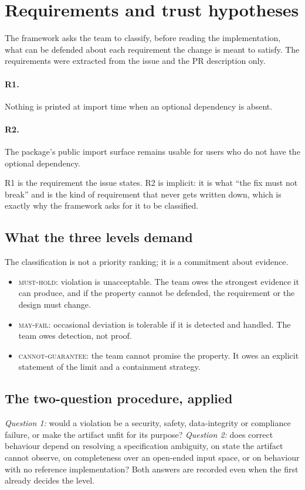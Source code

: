 \documentclass[11pt,a4paper]{article}
\newcommand{\musthold}{\textsc{must-hold}}
\newcommand{\mayfail}{\textsc{may-fail}}
\newcommand{\cannot}{\textsc{cannot-guarantee}}
\begin{document}
\section{Requirements and trust hypotheses}
\label{sec:hyp}

The framework asks the team to classify, before reading the implementation, what can be defended about each requirement the change is meant to satisfy. The requirements were extracted from the issue and the PR description only.

\paragraph{R1.} Nothing is printed at import time when an optional dependency is absent.

\paragraph{R2.} The package's public import surface remains usable for users who do not have the optional dependency.

R1 is the requirement the issue states. R2 is implicit: it is what ``the fix must not break'' and is the kind of requirement that never gets written down, which is exactly why the framework asks for it to be classified.

\subsection{What the three levels demand}
The classification is not a priority ranking; it is a commitment about evidence.
\begin{itemize}[nosep]
  \item \musthold: violation is unacceptable. The team owes the strongest evidence it can produce, and if the property cannot be defended, the requirement or the design must change.
  \item \mayfail: occasional deviation is tolerable if it is detected and handled. The team owes detection, not proof.
  \item \cannot: the team cannot promise the property. It owes an explicit statement of the limit and a containment strategy.
\end{itemize}

\subsection{The two-question procedure, applied}
\emph{Question 1:} would a violation be a security, safety, data-integrity or compliance failure, or make the artifact unfit for its purpose? \emph{Question 2:} does correct behaviour depend on resolving a specification ambiguity, on state the artifact cannot observe, on completeness over an open-ended input space, or on behaviour with no reference implementation? Both answers are recorded even when the first already decides the level.
\end{document}
